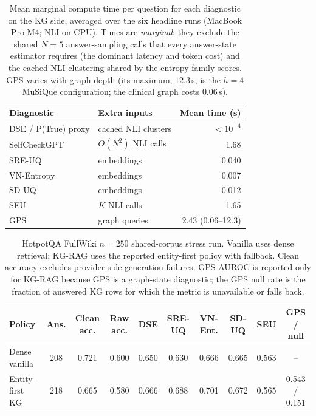 \begin{table}[t]
\centering
\small
\caption{Mean marginal compute time per question for each diagnostic on the
KG side, averaged over the six headline runs (MacBook Pro M4; NLI on CPU).
Times are \emph{marginal}: they exclude the shared $N=5$ answer-sampling
calls that every answer-state estimator requires (the dominant
latency and token cost) and the cached NLI clustering shared by the
entropy-family scores.
GPS varies with graph depth (its maximum, $12.3$\,s, is the $h=4$ MuSiQue
configuration; the clinical graph costs $0.06$\,s).
\label{tab:compute_cost}}
\setlength{\tabcolsep}{5pt}
\begin{tabular}{@{}llr@{}}
\toprule
Diagnostic & Extra inputs & Mean time (s) \\
\midrule
DSE / P(True) proxy & cached NLI clusters & $<10^{-4}$ \\
SelfCheckGPT & $O(N^2)$ NLI calls & 1.68 \\
SRE-UQ & embeddings & 0.040 \\
VN-Entropy & embeddings & 0.007 \\
SD-UQ & embeddings & 0.012 \\
SEU & $K$ NLI calls & 1.65 \\
GPS & graph queries & 2.43 (0.06--12.3) \\
\bottomrule
\end{tabular}
\end{table}



\begin{table}[t]
\centering
\small
\caption{HotpotQA FullWiki $n=250$ shared-corpus stress run.
Vanilla uses dense retrieval; KG-RAG uses the reported entity-first policy
with fallback.
Clean accuracy excludes provider-side generation failures.
GPS AUROC is reported only for KG-RAG because GPS is a graph-state diagnostic;
the GPS null rate is the fraction of answered KG rows for which the metric is
unavailable or falls back.
\label{tab:hotpot_fullwiki_stress}}
\setlength{\tabcolsep}{4pt}
\begin{tabular}{@{}lccccccccc@{}}
\toprule
Policy & Ans. & Clean acc. & Raw acc. & DSE & SRE-UQ & VN-Ent. & SD-UQ & SEU & GPS / null \\
\midrule
Dense vanilla & 208 & 0.721 & 0.600 & 0.650 & 0.630 & 0.666 & 0.665 & 0.563 & -- \\
Entity-first KG & 218 & 0.665 & 0.580 & 0.666 & 0.688 & 0.701 & 0.672 & 0.565 & 0.543 / 0.151 \\
\bottomrule
\end{tabular}
\end{table}

